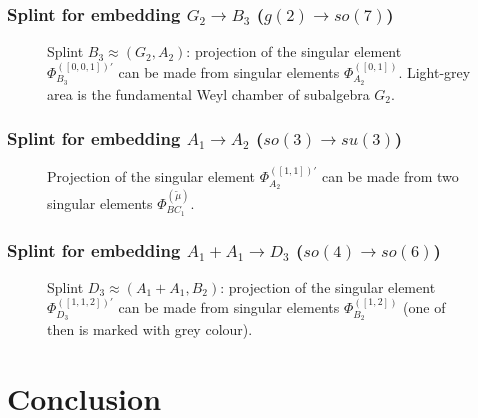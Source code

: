 \documentclass[pdftex]{beamer}
\theoremstyle{definition} \newtheorem{Def}{Definition}
\begin{document}
\begin{frame}
  \frametitle{Splint for embedding $G_2\rightarrow B_3$ ($g(2)\rightarrow so(7)$)}

  \begin{figure}[h]
    \caption{Splint $B_3\approx (G_2,A_2)$: projection of the singular element $\Phi_{B_3}^{([0,0,1])'}$ can be made from singular elements $\Phi_{A_2}^{([0,1])}$. Light-grey area is the fundamental Weyl chamber of subalgebra $G_2$.}
    \label{ris6}
  \end{figure}


\end{frame}

\begin{frame}
  \frametitle{Splint for embedding $A_1\rightarrow A_2$ ($so(3)\rightarrow su(3)$)}

  \begin{figure}[h]
    \label {a5}
    \caption{Projection of the singular element $\Phi_{A_2}^{([1,1])'}$ can be made from two singular elements $\Phi_{BC_1}^{(\tilde{\mu})}$.}
  \end{figure}


\end{frame}

\begin{frame}
  \frametitle{Splint for embedding $A_1+A_1\rightarrow D_3$ ($so(4)\rightarrow so(6)$)}

  \begin{figure}[h]
    \caption{Splint $D_3\approx (A_1+A_1,B_2)$: projection of the singular element $\Phi_{D_3}^{([1,1,2])'}$ can be made from singular elements $\Phi_{B_2}^{([1,2])}$ (one of then is marked with grey colour).}
    \label{ris4}
  \end{figure}


\end{frame}


\section{Conclusion}
\end{document}

